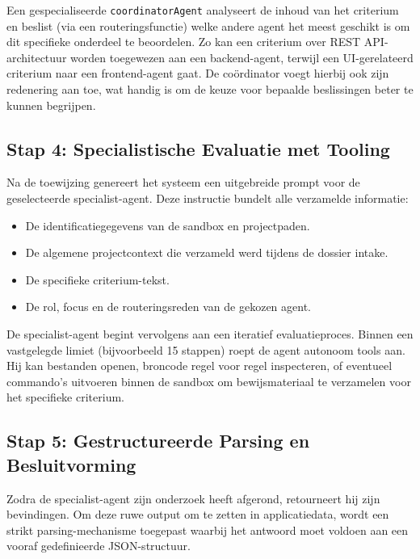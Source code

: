 \vspace{1em}

Een gespecialiseerde \texttt{coordinatorAgent} analyseert de inhoud van het criterium en beslist (via een routeringsfunctie) welke andere agent het meest geschikt is om dit specifieke onderdeel te beoordelen. Zo kan een criterium over REST API-architectuur worden toegewezen aan een backend-agent, terwijl een UI-gerelateerd criterium naar een frontend-agent gaat. De coördinator voegt hierbij ook zijn redenering aan toe, wat handig is om de keuze voor bepaalde beslissingen beter te kunnen begrijpen.

\subsection{Stap 4: Specialistische Evaluatie met Tooling}

Na de toewijzing genereert het systeem een uitgebreide prompt voor de geselecteerde specialist-agent. Deze instructie bundelt alle verzamelde informatie:
\begin{itemize}
    \item De identificatiegegevens van de sandbox en projectpaden.
    \item De algemene projectcontext die verzameld werd tijdens de dossier intake.
    \item De specifieke criterium-tekst.
    \item De rol, focus en de routeringsreden van de gekozen agent.
\end{itemize}

De specialist-agent begint vervolgens aan een iteratief evaluatieproces. Binnen een vastgelegde limiet (bijvoorbeeld 15 stappen) roept de agent autonoom tools aan. Hij kan bestanden openen, broncode regel voor regel inspecteren, of eventueel commando's uitvoeren binnen de sandbox om bewijsmateriaal te verzamelen voor het specifieke criterium.

\subsection{Stap 5: Gestructureerde Parsing en Besluitvorming}

Zodra de specialist-agent zijn onderzoek heeft afgerond, retourneert hij zijn bevindingen. Om deze ruwe output om te zetten in applicatiedata, wordt een strikt parsing-mechanisme toegepast waarbij het antwoord moet voldoen aan een vooraf gedefinieerde JSON-structuur.

\vspace{1em}

